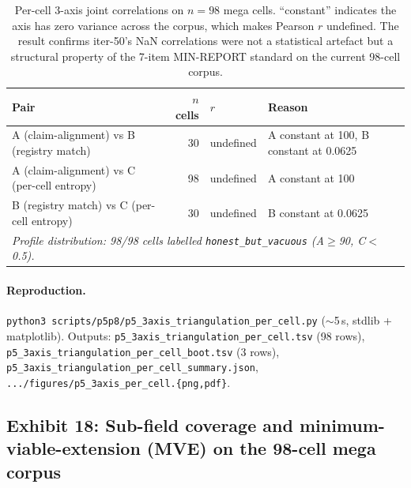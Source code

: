 \begin{table}[t]
\centering\small
\caption{Per-cell 3-axis joint correlations on $n{=}98$ mega cells.
``constant'' indicates the axis has zero variance across the corpus,
which makes Pearson $r$ undefined. The result confirms iter-50's NaN
correlations were not a statistical artefact but a structural property
of the 7-item MIN-REPORT standard on the current 98-cell corpus.}
\label{tab:p5-3axis-degenerate}
\begin{tabular}{lrll}
\toprule
Pair & $n$ cells & $r$ & Reason \\
\midrule
A (claim-alignment) vs B (registry match)    &  30 & undefined & A constant at 100, B constant at 0.0625 \\
A (claim-alignment) vs C (per-cell entropy)  &  98 & undefined & A constant at 100 \\
B (registry match) vs C (per-cell entropy)   &  30 & undefined & B constant at 0.0625 \\
\midrule
\multicolumn{4}{l}{\emph{Profile distribution: 98/98 cells labelled
\texttt{honest\_but\_vacuous} (A$\geq$90, C$<$0.5).}} \\
\bottomrule
\end{tabular}
\end{table}

\paragraph{Reproduction.}
\texttt{python3 scripts/p5p8/p5\_3axis\_triangulation\_per\_cell.py}
($\sim$5\,s, stdlib + matplotlib). Outputs:
\texttt{p5\_3axis\_triangulation\_per\_cell.tsv} (98 rows),
\texttt{p5\_3axis\_triangulation\_per\_cell\_boot.tsv} (3 rows),
\texttt{p5\_3axis\_triangulation\_per\_cell\_summary.json},
\texttt{.../figures/p5\_3axis\_per\_cell.\{png,pdf\}}.

\subsection{Exhibit 18: Sub-field coverage and minimum-viable-extension (MVE) on the 98-cell mega corpus}
\label{sec:p5-subfield-audit}

